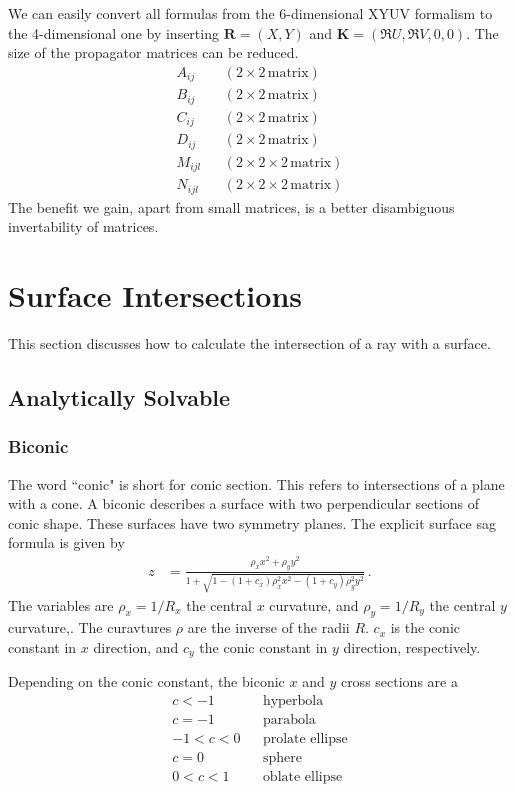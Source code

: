 \documentclass[12pt,a4paper,twoside,openright,BCOR10mm,headsepline,titlepage,abstracton,chapterprefix,final]{scrreprt}
\newcommand\Vector[1]{{\mathbf{#1}}}
\begin{document}
We can easily convert all formulas from the 6-dimensional XYUV formalism to the 4-dimensional one by inserting
$\Vector{R} = (X,Y)$ and $\Vector{K} = (\Re U, \Re V, 0, 0)$.
The size of the propagator matrices can be reduced.
\begin{subequations}
\begin{align}
 A_{ij}  && (2\times2 \,\textrm{matrix}) \\
 B_{ij}  && (2\times2 \,\textrm{matrix}) \\
 C_{ij}  && (2\times2 \,\textrm{matrix}) \\
 D_{ij}  && (2\times2 \,\textrm{matrix}) \\
 M_{ijl} && (2\times2\times2 \,\textrm{matrix}) \\
 N_{ijl} && (2\times2\times2 \,\textrm{matrix})
\end{align}
\end{subequations}
The benefit we gain, apart from small matrices, is a better disambiguous invertability of matrices.


\chapter{Surface Intersections}\label{subsec:intersectionformulas}
This section discusses how to calculate the intersection of a ray with a surface.


\section{Analytically Solvable}
\subsection{Biconic}
The word ``conic" is short for conic section. 
This refers to intersections of a plane with a cone.
A biconic describes a surface with two perpendicular sections of conic shape. 
These surfaces have two symmetry planes.
The explicit surface sag formula is given by
\begin{align}
 z &= \frac{\rho_x x^2 + \rho_y y^2}{1 + \sqrt{1 - (1+c_x) \rho_x^2 x^2 - (1+c_y) \rho_y^2 y^2}} \label{eq:biconic}\,.
\end{align}
The variables are $\rho_x = 1/R_x$ the central $x$ curvature, and $\rho_y = 1/R_y$ the central $y$ curvature,.
The curavtures $\rho$ are the inverse of the radii $R$.
$c_x$ is the conic constant in $x$ direction,
and $c_y$ the conic constant in $y$ direction, respectively. 

Depending on the conic constant, the biconic $x$ and $y$ cross sections are a
\begin{eqnarray*}
     c < -1 && \textrm{hyperbola} \\
     c = -1 && \textrm{parabola} \\
-1 < c < 0 && \textrm{prolate ellipse} \\
     c = 0 && \textrm{sphere} \\
 0 < c < 1 && \textrm{oblate ellipse}
\end{eqnarray*}
\end{document}
